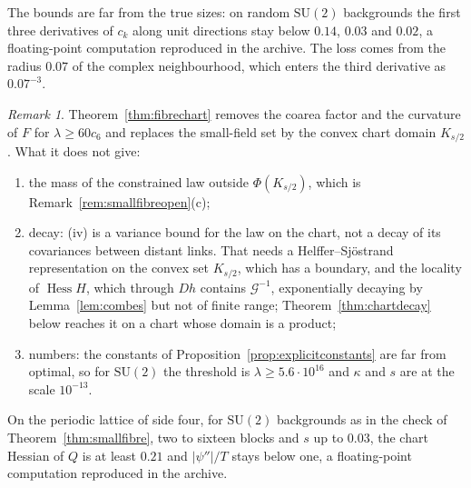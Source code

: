 \documentclass[11pt]{amsart}
\theoremstyle{definition}
\theoremstyle{remark}
\newtheorem{remark}[theorem]{Remark}
\numberwithin{equation}{section}
\newcommand{\SU}{\mathrm{SU}}
\newcommand{\Hess}{\operatorname{Hess}}
\begin{document}
The bounds are far from the true sizes: on random $\SU(2)$ backgrounds the
first three derivatives of $c_k$ along unit directions stay below $0.14$,
$0.03$ and $0.02$, a floating-point computation reproduced in the archive.
The loss comes from the radius $0.07$ of the complex neighbourhood, which
enters the third derivative as $0.07^{-3}$.

\begin{remark}\label{rem:fibrechartopen}
Theorem~\ref{thm:fibrechart} removes the coarea factor and the curvature of
$F$ for $\lambda\ge60c_6$ and replaces the small-field set by the convex
chart domain $K_{s/2}$. What it does not give:
\begin{enumerate}[label=\textup{(\alph*)},leftmargin=*]
\item the mass of the constrained law outside $\Phi(K_{s/2})$, which is
Remark~\ref{rem:smallfibreopen}(c);
\item decay: (iv) is a variance bound for the law on the chart, not a decay
of its covariances between distant links. That needs a
Helffer--Sj\"ostrand representation on the convex set $K_{s/2}$, which has
a boundary, and the locality of $\Hess H$, which through $Dh$ contains
$\mathcal G^{-1}$, exponentially decaying by Lemma~\ref{lem:combes} but not
of finite range; Theorem~\ref{thm:chartdecay} below reaches it on
a chart whose domain is a product;
\item numbers: the constants of Proposition~\ref{prop:explicitconstants}
are far from optimal, so for $\SU(2)$ the threshold is $\lambda\ge5.6\cdot
10^{16}$ and $\kappa$ and $s$ are at the scale $10^{-13}$.
\end{enumerate}
On the periodic lattice of side four, for $\SU(2)$ backgrounds as in the
check of Theorem~\ref{thm:smallfibre}, two to sixteen blocks and $s$ up to
$0.03$, the chart Hessian of $Q$ is at least $0.21$
and $\lvert\psi''\rvert/T$ stays below one, a floating-point computation
reproduced in the archive.
\end{remark}
\end{document}
